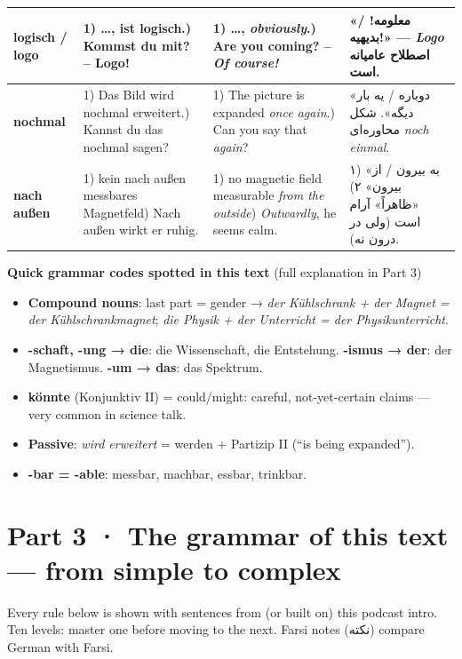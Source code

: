 \documentclass[10pt]{article}
\newcommand{\w}[1]{\textbf{#1}}
\newcommand{\fa}[1]{{\farsifont\beginR #1\endR}}
\newcommand{\en}[1]{\beginL #1\endL}
\newcounter{wn}
\begin{document}
\begin{longtable}{|L{3.4cm}|L{8.6cm}|L{6.6cm}|F{6.3cm}|}
\w{logisch / logo} &
1) …, ist logisch.) Kommst du mit? – Logo! &
1) …, \emph{obviously}.) Are you coming? – \emph{Of course!} &
«معلومه! / بدیهیه!» — \en{\textit{Logo}} اصطلاح عامیانه است. \\\hline

\w{nochmal} &
1) Das Bild wird nochmal erweitert.) Kannst du das nochmal sagen? &
1) The picture is expanded \emph{once again}.) Can you say that \emph{again}? &
«دوباره / یه بار دیگه». شکل محاوره‌ای \en{\textit{noch einmal}}. \\\hline

\w{nach außen} &
1) kein nach außen messbares Magnetfeld) Nach außen wirkt er ruhig. &
1) no magnetic field measurable \emph{from the outside}) \emph{Outwardly}, he seems calm. &
۱) «به بیرون / از بیرون»\newline
۲) «ظاهراً» آرام است (ولی در درون نه). \\\hline
\end{longtable}

\vspace{6pt}
\noindent\textbf{Quick grammar codes spotted in this text} (full explanation in Part 3)
\begin{itemize}\setlength\itemsep{1pt}
\item \textbf{Compound nouns}: last part = gender → \emph{der Kühlschrank + der Magnet = der Kühlschrankmagnet}; \emph{die Physik + der Unterricht = der Physikunterricht}.
\item \textbf{-schaft, -ung → die}: die Wissenschaft, die Entstehung. \textbf{-ismus → der}: der Magnetismus. \textbf{-um → das}: das Spektrum.
\item \textbf{könnte} (Konjunktiv II) = could/might: careful, not-yet-certain claims — very common in science talk.
\item \textbf{Passive}: \emph{wird erweitert} = werden + Partizip II (“is being expanded”).
\item \textbf{-bar = -able}: messbar, machbar, essbar, trinkbar.
\end{itemize}


\newpage
\section*{Part 3 · The grammar of this text — from simple to complex}
Every rule below is shown with sentences from (or built on) this podcast intro.
Ten levels: master one before moving to the next. Farsi notes (\fa{نکته}) compare German with Farsi.
\end{document}
